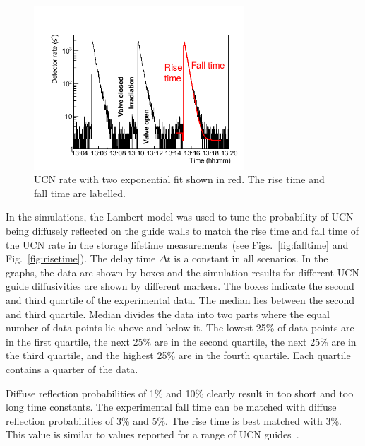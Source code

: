 \begin{figure}[h!]
  \centering
  \includegraphics[width=0.7\textwidth]{risefalltime.png}
  \caption[UCN cycle with a two exponential fit]{UCN rate with two
    exponential fit shown in red. The rise time and fall time are
    labelled.}
  \label{fig:risefalltime}
\end{figure}

In the simulations, the Lambert model was used to tune the probability
of UCN being diffusely reflected on the guide walls to match the rise
time and fall time of the UCN rate in the storage lifetime
measurements~(see Figs.~\ref{fig:falltime} and
Fig.~\ref{fig:risetime}).  The delay time $\Delta t$ is a constant in
all scenarios.  In the graphs, the data are shown by boxes and the
simulation results for different UCN guide diffusivities are shown by
different markers. The boxes indicate the second and third quartile of
the experimental data. The median lies between the second and third
quartile. Median divides the data into two parts where the equal
number of data points lie above and below it. The lowest 25\% of data
points are in the first quartile, the next 25\% are in the second
quartile, the next 25\% are in the third quartile, and the highest
25\% are in the fourth quartile. Each quartile contains a quarter of
the data.


Diffuse reflection probabilities of 1\% and 10\% clearly result in too
short and too long time constants. The experimental fall time can be
matched with diffuse reflection probabilities of 3\% and 5\%. The rise
time is best matched with 3\%. This value is similar to values
reported for a range of UCN
guides~\cite{DAUM201471,Wlokka2017,Atchison2010}.




